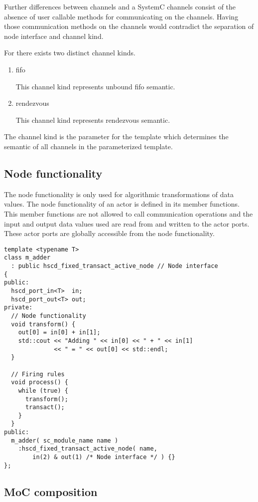 Further differences between \SysteMoC{} channels and a SystemC channels consist of the
absence of user callable methods for communicating on the \SysteMoC{} channels.
Having those communication methods on the channels would contradict the separation
of node interface and channel kind.

For \SysteMoCV{} there exists two distinct channel kinds.

\begin{enumerate}
\item fifo

This channel kind represents unbound fifo semantic.


\item rendezvous

This channel kind represents rendezvous semantic.

\end{enumerate}

The channel kind is the parameter for the
 template which determines
the semantic of all channels in the parameterized
 template.


\subsection{Node functionality}
The node functionality is only used for algorithmic transformations of data values.
The node functionality of an actor is defined in its member functions.
This member functions are not allowed to call communication operations and
the input and output data values used are read from
and written to the actor ports. These actor ports are globally accessible
from the node functionality.

\begin{verbatim}
template <typename T>
class m_adder
  : public hscd_fixed_transact_active_node // Node interface
{
public:
  hscd_port_in<T>  in;
  hscd_port_out<T> out;
private:
  // Node functionality
  void transform() {
    out[0] = in[0] + in[1];
    std::cout << "Adding " << in[0] << " + " << in[1]
              << " = " << out[0] << std::endl;
  }
  
  // Firing rules
  void process() {
    while (true) {
      transform();
      transact();
    }
  }
public:
  m_adder( sc_module_name name )
    :hscd_fixed_transact_active_node( name,
        in(2) & out(1) /* Node interface */ ) {}
};
\end{verbatim}

\subsection{MoC composition}

